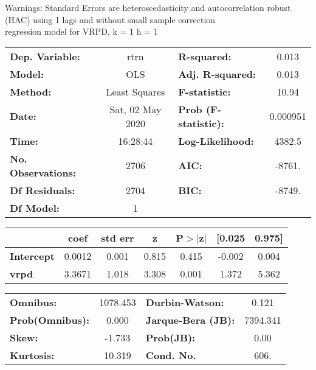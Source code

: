 Warnings: \newline
 [1] Standard Errors are heteroscedasticity and autocorrelation robust (HAC) using 1 lags and without small sample correction\\ 

regression model for VRPD, k = 1 h = 1\begin{center}
\begin{tabular}{lclc}
\toprule
\textbf{Dep. Variable:}    &       rtrn       & \textbf{  R-squared:         } &     0.013   \\
\textbf{Model:}            &       OLS        & \textbf{  Adj. R-squared:    } &     0.013   \\
\textbf{Method:}           &  Least Squares   & \textbf{  F-statistic:       } &     10.94   \\
\textbf{Date:}             & Sat, 02 May 2020 & \textbf{  Prob (F-statistic):} &  0.000951   \\
\textbf{Time:}             &     16:28:44     & \textbf{  Log-Likelihood:    } &    4382.5   \\
\textbf{No. Observations:} &        2706      & \textbf{  AIC:               } &    -8761.   \\
\textbf{Df Residuals:}     &        2704      & \textbf{  BIC:               } &    -8749.   \\
\textbf{Df Model:}         &           1      & \textbf{                     } &             \\
\bottomrule
\end{tabular}
\begin{tabular}{lcccccc}
                   & \textbf{coef} & \textbf{std err} & \textbf{z} & \textbf{P$> |$z$|$} & \textbf{[0.025} & \textbf{0.975]}  \\
\midrule
\textbf{Intercept} &       0.0012  &        0.001     &     0.815  &         0.415        &       -0.002    &        0.004     \\
\textbf{vrpd}      &       3.3671  &        1.018     &     3.308  &         0.001        &        1.372    &        5.362     \\
\bottomrule
\end{tabular}
\begin{tabular}{lclc}
\textbf{Omnibus:}       & 1078.453 & \textbf{  Durbin-Watson:     } &    0.121  \\
\textbf{Prob(Omnibus):} &   0.000  & \textbf{  Jarque-Bera (JB):  } & 7394.341  \\
\textbf{Skew:}          &  -1.733  & \textbf{  Prob(JB):          } &     0.00  \\
\textbf{Kurtosis:}      &  10.319  & \textbf{  Cond. No.          } &     606.  \\
\bottomrule
\end{tabular}
\end{center}

